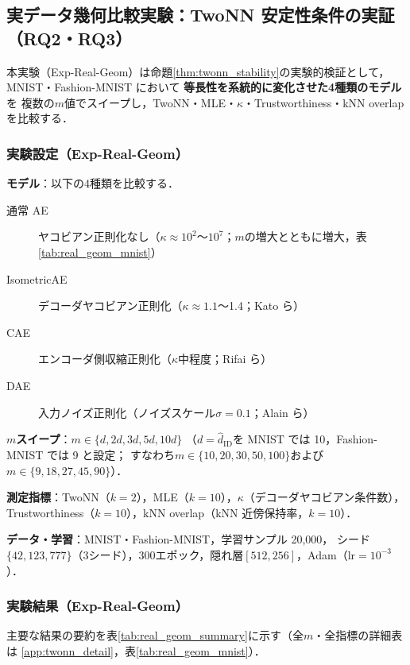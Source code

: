 \documentclass[11pt,a4paper]{jsarticle}
\newcommand{\kap}{\kappa}
\begin{document}
\subsection{実データ幾何比較実験：TwoNN 安定性条件の実証（RQ2・RQ3）}\label{sec:exp_real_geom}

本実験（Exp-Real-Geom）は命題\ref{thm:twonn_stability}の実験的検証として，
MNIST・Fashion-MNIST において \textbf{等長性を系統的に変化させた4種類のモデル}を
複数の$m$値でスイープし，TwoNN・MLE・$\kap$・Trustworthiness・kNN overlap を比較する．

\subsubsection*{実験設定（Exp-Real-Geom）}

\textbf{モデル}：以下の4種類を比較する．
\begin{description}
  \item[通常 AE] ヤコビアン正則化なし（$\kap \approx 10^2$〜$10^7$；$m$の増大とともに増大，表\ref{tab:real_geom_mnist}）
  \item[IsometricAE] デコーダヤコビアン正則化（$\kap \approx 1.1$〜1.4；Kato ら\cite{kato2020rdae}）
  \item[CAE] エンコーダ側収縮正則化（$\kap$中程度；Rifai ら\cite{rifai2011cae}）
  \item[DAE] 入力ノイズ正則化（ノイズスケール$\sigma=0.1$；Alain ら\cite{alain2014dae}）
\end{description}

\textbf{$m$スイープ}：$m \in \{d, 2d, 3d, 5d, 10d\}$
（$d = \hat{d}_\mathrm{ID}$を MNIST では 10，Fashion-MNIST では 9 と設定；
すなわち$m \in \{10, 20, 30, 50, 100\}$および$m \in \{9, 18, 27, 45, 90\}$）．

\textbf{測定指標}：TwoNN（$k=2$），MLE（$k=10$），$\kap$（デコーダヤコビアン条件数），
Trustworthiness（$k=10$），kNN overlap（kNN 近傍保持率，$k=10$）．

\textbf{データ・学習}：MNIST・Fashion-MNIST，学習サンプル 20,000，
シード$\{42, 123, 777\}$（3シード），300エポック，隠れ層$[512, 256]$，Adam（lr$=10^{-3}$）．

\subsubsection*{実験結果（Exp-Real-Geom）}

主要な結果の要約を表\ref{tab:real_geom_summary}に示す（全$m$・全指標の詳細表は
\ref{app:twonn_detail}，表\ref{tab:real_geom_mnist}）．
\end{document}
